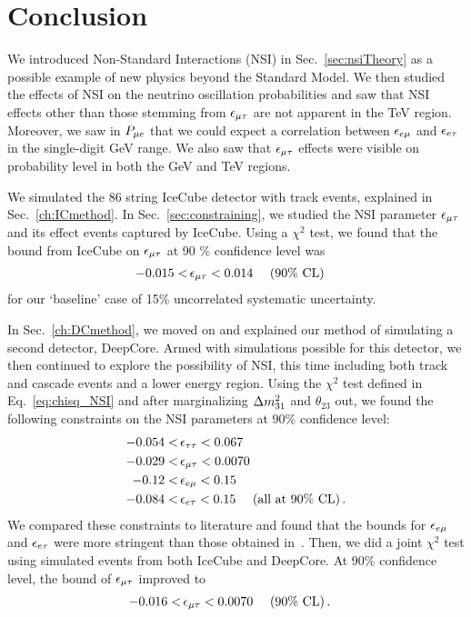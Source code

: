 \section*{Conclusion}\label{ch:conc}
We introduced Non-Standard Interactions (NSI) in Sec.~\ref{sec:nsiTheory} as a possible example of new physics beyond the Standard Model.
We then studied the effects of NSI on the neutrino oscillation probabilities and saw that NSI effects other than those stemming from $\epsilon_{\mu\tau}$ are not apparent in the \si{\TeV} region.
Moreover, we saw in $P_{\mu e}$ that we could expect a correlation between $\epsilon_{e\mu}$ and $\epsilon_{e\tau}$ in the single-digit \si{\GeV} range.
We also saw that $\epsilon_{\mu\tau}$ effects were visible on probability level in both the \si{\GeV} and \si{\TeV} regions.

We simulated the 86 string IceCube detector with track events, explained in Sec.~\ref{ch:ICmethod}.
In Sec.~\ref{sec:constraining}, we studied the NSI parameter $\epsilon_{\mu\tau}$ and its effect events captured by IceCube. 
Using a $\chi^2$ test, we found that the bound from IceCube on $\epsilon_{\mu\tau}$ at 90 \% confidence level was 
\begin{align}
    -0.015 <\,& \epsilon_{\mu\tau} < 0.014\ \quad (90\% \text{ CL})
\end{align}
for our `baseline' case of 15\% uncorrelated systematic uncertainty.

In Sec.~\ref{ch:DCmethod}, we moved on and explained our method of simulating a second detector, DeepCore. Armed with simulations possible for this detector, we then continued to explore the possibility of NSI, this time including both track and cascade events and a lower energy region.
Using the $\chi^2$ test defined in Eq.~\ref{eq:chisq_NSI} and after marginalizing $\dm[31]$ and $\theta_{23}$ out, we found the following constraints on the NSI parameters at 90\% confidence level:
\begin{align}
    -0.054 <&\, \epsilon_{\tau\tau} < 0.067 \nonumber \\
    -0.029 <&\, \epsilon_{\mu\tau} < 0.0070 \nonumber \\
    -0.12 <&\, \epsilon_{e\mu} < 0.15 \nonumber \\
    -0.084 <&\, \epsilon_{e\tau} < 0.15\ \quad (\text{all at }90\% \text{ CL})\,.
 \end{align}
We compared these constraints to literature and found that the bounds for $\epsilon_{e\mu}$ and $\epsilon_{e\tau}$ were more stringent than those obtained in~\cite{demidov}.
Then, we did a joint $\chi^2$ test using simulated events from both IceCube and DeepCore. At 90\% confidence level, the bound of $\epsilon_{\mu\tau}$ improved to
\begin{align}
    -0.016 <&\, \epsilon_{\mu\tau} < 0.0070\ \quad (90\% \text{ CL})\,.
 \end{align}

